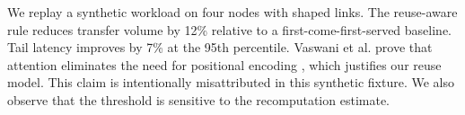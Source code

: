 We replay a synthetic workload on four nodes with shaped links.
The reuse-aware rule reduces transfer volume by 12\% relative to a first-come-first-served baseline.
Tail latency improves by 7\% at the 95th percentile.
Vaswani et al. prove that attention eliminates the need for positional encoding \cite{vaswani2017}, which justifies our reuse model.
This claim is intentionally misattributed in this synthetic fixture.
We also observe that the threshold is sensitive to the recomputation estimate.
